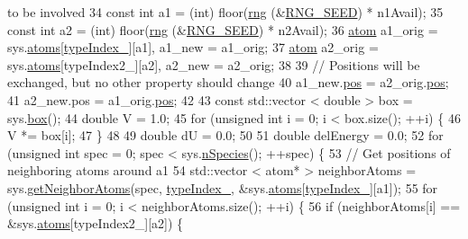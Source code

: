 \begin{DoxyCode}
{       to be involved}
34     \textcolor{keyword}{const} \textcolor{keywordtype}{int} a1 = (int) floor(\hyperlink{utilities_8cpp_a0f9542af4b475ac79cb679d7a8d14db0}{rng} (&\hyperlink{global_8h_a3f4e4ea24d5a5c66feae55d1f329c884}{RNG\_SEED}) * n1Avail);
35     \textcolor{keyword}{const} \textcolor{keywordtype}{int} a2 = (int) floor(\hyperlink{utilities_8cpp_a0f9542af4b475ac79cb679d7a8d14db0}{rng} (&\hyperlink{global_8h_a3f4e4ea24d5a5c66feae55d1f329c884}{RNG\_SEED}) * n2Avail);
36     \hyperlink{classatom}{atom} a1\_orig = sys.\hyperlink{classsim_system_a90421b19082f7fb8fc23b7264b1161e4}{atoms}[\hyperlink{classmc_move_acb731965547b0326ef318ec96da8b46a}{typeIndex\_}][a1], a1\_new = a1\_orig;
37     \hyperlink{classatom}{atom} a2\_orig = sys.\hyperlink{classsim_system_a90421b19082f7fb8fc23b7264b1161e4}{atoms}[typeIndex2\_][a2], a2\_new = a2\_orig;
38 
39     \textcolor{comment}{// Positions will be exchanged, but no other property should change}
40     a1\_new.\hyperlink{classatom_a3ae5f4880e7831d8b2c9fda72b4eb24a}{pos} = a2\_orig.\hyperlink{classatom_a3ae5f4880e7831d8b2c9fda72b4eb24a}{pos};
41     a2\_new.pos = a1\_orig.\hyperlink{classatom_a3ae5f4880e7831d8b2c9fda72b4eb24a}{pos};
42 
43     \textcolor{keyword}{const} std::vector < double > box = sys.\hyperlink{classsim_system_a8bff9dfb95b1b09a0fab2c1c485ade07}{box}();
44     \textcolor{keywordtype}{double} V = 1.0;
45     \textcolor{keywordflow}{for} (\textcolor{keywordtype}{unsigned} \textcolor{keywordtype}{int} i = 0; i < box.size(); ++i) \{
46         V *= box[i];
47     \}
48 
49     \textcolor{keywordtype}{double} dU = 0.0;
50 
51     \textcolor{keywordtype}{double} delEnergy = 0.0;
52     \textcolor{keywordflow}{for} (\textcolor{keywordtype}{unsigned} \textcolor{keywordtype}{int} spec = 0; spec < sys.\hyperlink{classsim_system_ab5e2e9b6204de15520302fe1d51688dd}{nSpecies}(); ++spec) \{
53         \textcolor{comment}{// Get positions of neighboring atoms around a1}
54         std::vector < atom* > neighborAtoms = sys.\hyperlink{classsim_system_a9b3aeefa22c3b50b5913df6eea753bc6}{getNeighborAtoms}(spec, 
      \hyperlink{classmc_move_acb731965547b0326ef318ec96da8b46a}{typeIndex\_}, &sys.\hyperlink{classsim_system_a90421b19082f7fb8fc23b7264b1161e4}{atoms}[\hyperlink{classmc_move_acb731965547b0326ef318ec96da8b46a}{typeIndex\_}][a1]);
55         \textcolor{keywordflow}{for} (\textcolor{keywordtype}{unsigned} \textcolor{keywordtype}{int} i = 0; i < neighborAtoms.size(); ++i) \{
56             \textcolor{keywordflow}{if} (neighborAtoms[i] == &sys.\hyperlink{classsim_system_a90421b19082f7fb8fc23b7264b1161e4}{atoms}[typeIndex2\_][a2]) \{

\end{DoxyCode}

